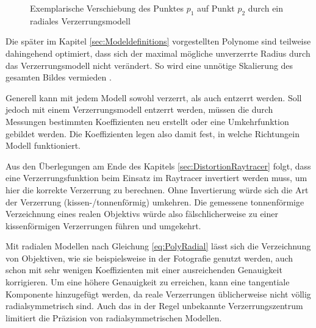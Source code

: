 \begin{figure}[h]
	\centering
	
	\caption{Exemplarische Verschiebung des Punktes $p_1$ auf Punkt $p_2$ durch ein radiales Verzerrungsmodell}
	\label{fig:DistExample}
\end{figure}

Die später im Kapitel \ref{sec:Modeldefinitions} vorgestellten Polynome sind teilweise dahingehend optimiert, dass sich der maximal mögliche unverzerrte Radius durch das Verzerrungsmodell nicht verändert. So wird eine unnötige Skalierung des gesamten Bildes vermieden \cite{ScalePreservingLensDistortion}.

Generell kann mit jedem Modell sowohl verzerrt, als auch entzerrt werden. Soll jedoch mit einem Verzerrungsmodell entzerrt werden, müssen die durch Messungen bestimmten Koeffizienten neu erstellt oder eine Umkehrfunktion gebildet werden. Die Koeffizienten legen also damit fest, in welche \glqq Richtung\grqq{ }ein Modell funktioniert.

Aus den Überlegungen am Ende des Kapitels \ref{sec:DistortionRaytracer} folgt, dass eine Verzerrungsfunktion beim Einsatz im Raytracer invertiert werden muss, um hier die korrekte Verzerrung zu berechnen. Ohne Invertierung würde sich die Art der Verzerrung (kissen-/tonnenförmig) umkehren. Die gemessene tonnenförmige Verzeichnung eines realen Objektivs würde also fälschlicherweise zu einer kissenförmigen Verzerrungen führen und umgekehrt.

Mit radialen Modellen nach Gleichung \ref{eq:PolyRadial} lässt sich die Verzeichnung von Objektiven, wie sie beispielsweise in der Fotografie genutzt werden, auch schon mit sehr wenigen Koeffizienten mit einer ausreichenden Genauigkeit korrigieren. Um eine höhere Genauigkeit zu erreichen, kann eine tangentiale Komponente hinzugefügt werden, da reale Verzerrungen üblicherweise nicht völlig radialsymmetrisch sind. Auch das in der Regel unbekannte Verzerrungszentrum limitiert die Präzision von radialsymmetrischen Modellen. 